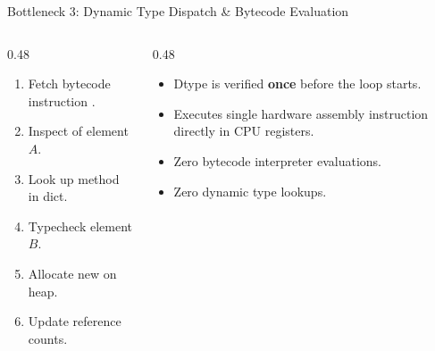 \begin{frame}{Bottleneck 3: Dynamic Type Dispatch \& Bytecode Evaluation}
  \begin{columns}[T,onlytextwidth]
    \begin{column}{0.48\textwidth}
      \begin{tcolorbox}[enhanced,arc=1.2mm,boxrule=.4pt,colback=UpGradRed!8,colframe=UpGradRed,title={\bfseries\scriptsize Pure Python: 6 Steps per Addition $\times$ 10M},coltitle=white]
        \scriptsize
        \begin{enumerate}\setlength{\itemsep}{0.04cm}
          \item Fetch bytecode instruction .
          \item Inspect  of element $A$.
          \item Look up  method in dict.
          \item Typecheck element $B$.
          \item Allocate new  on heap.
          \item Update reference counts.
        \end{enumerate}
      \end{tcolorbox}
    \end{column}
    \begin{column}{0.48\textwidth}
      \begin{tcolorbox}[enhanced,arc=1.2mm,boxrule=.4pt,colback=AWSEmerald!8,colframe=AWSEmerald,title={\bfseries\scriptsize NumPy: Single Compiled C-Loop},coltitle=white]
        \scriptsize
        \begin{itemize}\setlength{\itemsep}{0.08cm}
          \item Dtype is verified \textbf{once} before the loop starts.
          \item Executes single hardware assembly  instruction directly in CPU registers.
          \item Zero bytecode interpreter evaluations.
          \item Zero dynamic type lookups.
        \end{itemize}
      \end{tcolorbox}
    \end{column}
  \end{columns}
  \vspace{0.15cm}
\end{frame}

